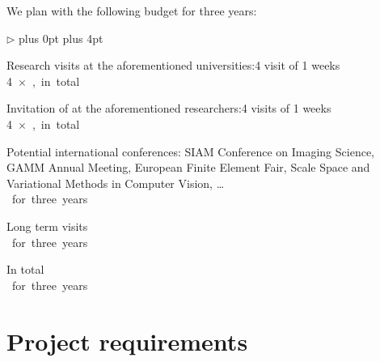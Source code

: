 \documentclass[enabledeprecatedfontcommands,cleardoublepage=empty,headsepline,twoside,11pt,DIV=15,BCOR=12mm,final]{scrartcl}
\renewenvironment{itemize}
{\begin{list}{$\triangleright$}{\labelwidth-2mm \leftmargin3mm %
  \itemsep5pt plus 0pt  \topsep3pt \parsep1pt plus 4pt \labelsep2mm}}
{\end{list}}
\begin{document}
We plan with the following budget for three years:
\begin{itemize}\itemsep=-1pt
\item Research visits at the aforementioned universities:\hfill {4 visit of 1 weeks}\\[-5mm]

 \dotfill\hbox{4 $\times$ ,  in total}
\item Invitation of at the aforementioned researchers:\hfill {4 visits of 1 weeks}\\[-5mm]

 \dotfill\hbox{4 $\times$ ,  in total}
%
\item Potential international conferences: SIAM Conference on Imaging Science, GAMM Annual Meeting, European Finite Element Fair, Scale Space and Variational Methods in Computer Vision,  \dots\\[-5mm]

  \dotfill\hbox{ for three years}
  \item Long term visits \\[-5mm]
  
   \dotfill\hbox{ for three years}
\item In total \\[-5mm]
  
   \dotfill\hbox{ for three years}
\end{itemize}

\section{Project requirements}
\label{sec:requirements}
\end{document}
